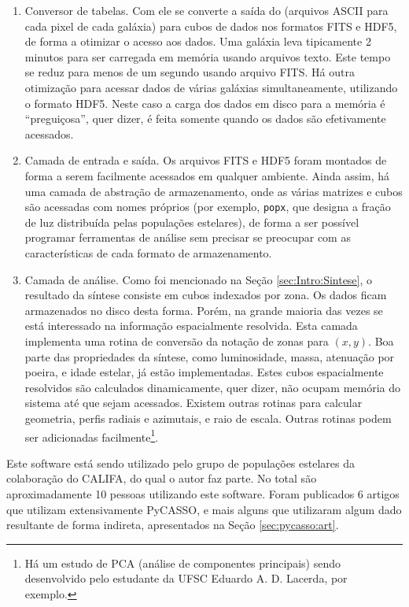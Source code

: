 \begin{enumerate}

\item Conversor de tabelas. Com ele se converte a saída do \starlight (arquivos
ASCII para cada pixel de cada galáxia) para cubos de dados nos formatos FITS e
HDF5, de forma a otimizar o acesso aos dados. Uma galáxia leva tipicamente 2
minutos para ser carregada em memória usando arquivos texto. Este tempo se reduz
para menos de um segundo usando arquivo FITS. Há outra otimização para acessar
dados de várias galáxias simultaneamente, utilizando o formato HDF5. Neste caso
a carga dos dados em disco para a memória é ``preguiçosa'', quer dizer, é feita
somente quando os dados são efetivamente acessados.

\item Camada de entrada e saída. Os arquivos FITS e HDF5 foram montados de forma
a serem facilmente acessados em qualquer ambiente. Ainda assim, há uma camada de
abstração de armazenamento, onde as várias matrizes e cubos são acessadas com
nomes próprios (por exemplo, \texttt{popx}, que designa a fração de luz
distribuída pelas populações estelares), de forma a ser possível programar
ferramentas de análise sem precisar se preocupar com as características de cada
formato de armazenamento.

\item Camada de análise. Como foi mencionado na Seção \ref{sec:Intro:Sintese}, o
resultado da síntese consiste em cubos indexados por zona. Os dados ficam
armazenados no disco desta forma. Porém, na grande maioria das vezes se está
interessado na informação espacialmente resolvida. Esta camada implementa uma
rotina de conversão da notação de zonas para $(x, y)$. Boa parte das
propriedades da síntese, como luminosidade, massa, atenuação por poeira, e idade
estelar, já estão implementadas. Estes cubos espacialmente resolvidos são
calculados dinamicamente, quer dizer, não ocupam memória do sistema até que
sejam acessados. Existem outras rotinas para calcular geometria, perfis radiais
e azimutais, e raio de escala. Outras rotinas podem ser adicionadas
facilmente\footnote{Há um estudo de PCA (análise de componentes principais)
sendo desenvolvido pelo estudante da UFSC Eduardo A. D. Lacerda, por
exemplo.}.

\end{enumerate}

Este software está sendo utilizado pelo grupo de populações estelares da
colaboração do CALIFA, do qual o autor faz parte. No total são aproximadamente
10 pessoas utilizando este software. Foram publicados 6 artigos que utilizam
extensivamente PyCASSO, e mais alguns que utilizaram algum dado resultante de
forma indireta, apresentados na Seção \ref{sec:pycasso:art}.


